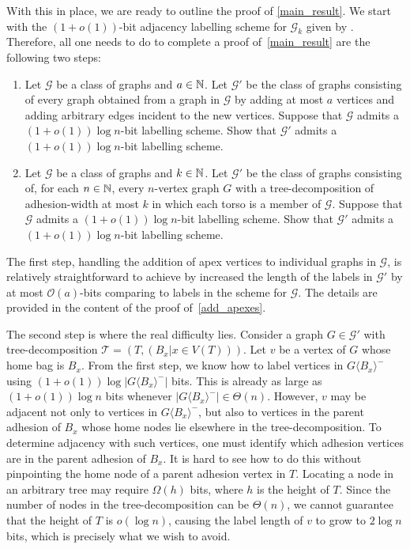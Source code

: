 \documentclass{patmorin}
\newcommand{\torso}[2]{{#1}\langle{#2}\rangle}
\newcommand{\Oh}{\calO}
\newcommand{\calG}{\mathcal{G}}
\newcommand{\calO}{\mathcal{O}}
\newcommand{\calT}{\mathcal{T}}
\begin{document}
With this in place, we are ready to outline the proof of \cref{main_result}. We start with
the $(1+o(1))$-bit adjacency labelling scheme for $\calG_k$ given by
\citet{dujmovic.esperet.ea:adjacency}.
Therefore, all one needs to do to complete a proof of~\cref{main_result}
are the following two steps:
\begin{enumerate}[label=\rm(\arabic*)]
\item \label{step:apex} Let $\calG$ be a class of graphs and $a\in\mathbb{N}$.
    Let $\calG'$ be the class of graphs consisting of
    every graph obtained from a graph in $\calG$
    by adding at most $a$ vertices and
    adding arbitrary edges incident to the new vertices.
    Suppose that $\calG$ admits a $(1+o(1))\log n$-bit labelling scheme.
    Show that $\calG'$ admits a $(1+o(1))\log n$-bit labelling scheme.
\item Let $\calG$ be a class of graphs and $k\in\mathbb{N}$.
      Let $\calG'$ be the class of graphs consisting of, for each $n\in\mathbb{N}$, every $n$-vertex graph $G$ with a tree-decomposition of adhesion-width at most $k$ in which each torso is a member of $\calG$.
      Suppose that $\calG$ admits a $(1+o(1))\log n$-bit labelling scheme.
      Show that $\calG'$ admits a $(1+o(1))\log n$-bit labelling scheme.
\end{enumerate}

The first step, handling the addition of apex vertices to individual graphs in $\calG$, is relatively straightforward to achieve by increased the length of the labels in $\calG'$ by at most $\Oh(a)$-bits comparing to labels in the scheme for $\calG$. The details are provided in the content of the proof of~\cref{add_apexes}.


The second step is where the real difficulty lies. Consider a graph $G\in \calG'$ with tree-decomposition $\calT = (T , (B_x | x \in V (T )))$. Let $v$ be a vertex  of $G$ whose home bag is ${B_x}$. From the first step, we know how to label vertices in $\torso{G}{B_x}^-$ using $(1+o(1))\log|\torso{G}{B_x}^-|$ bits. This is already as large as $(1+o(1))\log n$ bits whenever $|\torso{G}{B_x}^-|\in \Theta(n)$. However, $v$ may be adjacent not only to vertices in $\torso{G}{B_x}^-$, but also to vertices in the parent adhesion of $B_x$ whose home nodes lie elsewhere in the tree-decomposition. To determine adjacency with such vertices, one must identify which adhesion vertices are in the parent adhesion of $B_x$. It is hard to see how to do this without pinpointing the home node of a parent adhesion vertex in $T$. Locating a node in an arbitrary tree may require $\Omega(h)$ bits, where $h$ is the height of $T$.  Since the number of nodes in the tree-decomposition can be $\Theta(n)$, we cannot guarantee that the height of $T$ is $o(\log n)$, causing the label length of $v$ to grow to $2\log n$ bits, which is precisely what we wish to avoid.
\end{document}
